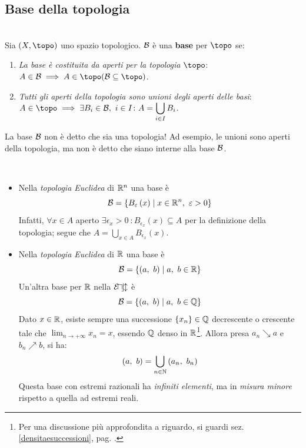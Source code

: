 \subsection{Base della topologia}
\begin{define}[Base.]~{}\\
Sia $\left(X, \topo\right)$ uno spazio topologico. $\mathcal{B}$ è una \textbf{base} per $\topo$ se:
\begin{enumerate}
\item \textit{La base è costituita da aperti per la topologia $\topo$}: $A\in\basis\implies A\in\topo (\basis\subseteq\topo)$.
\item \textit{Tutti gli aperti della topologia sono unioni degli aperti delle basi}:
$\displaystyle A\in\topo\implies\exists B_i\in\basis,\ i\in I\colon A=\bigcup_{i\in I}B_i$.
\end{enumerate}
\end{define}
\begin{attention}
La base $\mathcal{B}$ non è detto che sia una topologia! Ad esempio, le unioni sono aperti della topologia, ma non è detto che siano interne alla base $\mathcal{B}$.
\end{attention}
\begin{examples}~{}
\begin{itemize}
\item Nella \textit{topologia Euclidea} di $\mathbb{R}^n$ una base è
\begin{equation}
\mathcal{B}=\left\{B_{\varepsilon}\left(x\right)\mid x\in\mathbb{R}^n,\ \varepsilon>0\right\}
\end{equation}
Infatti, $\forall x\in A$ aperto $\exists\epsilon_x>0\ \colon B_{\epsilon_x}\left(x\right)\subseteq A$ per la definizione della topologia; segue che $\displaystyle A=\bigcup_{x\in A}B_{\epsilon_x}\left(x\right)$.
\item Nella \textit{topologia Euclidea} di $\mathbb{R}$ una base è
\begin{equation}
	\mathcal{B}=\left\{\left(a,\ b\right)\mid a,\ b\in \mathbb{R}\right\}
\end{equation}
Un'altra base per $\mathbb{R}$ nella $\mathcal{E\! u\! c\! l}$ è 
\begin{equation*}
	\mathcal{B}=\left\{\left(a,\ b\right)\mid a,\ b\in \mathbb{Q}\right\}
\end{equation*}
Dato $x\in\mathbb{R}$, esiste sempre una successione $\left\{x_n\right\}\in\mathbb{Q}$ decrescente o crescente tale che $\displaystyle\lim_{n \to +\infty}x_n=x$, essendo $\mathbb{Q}$ denso in $\mathbb{R}$\footnote{Per una discussione più approfondita a riguardo, si guardi sez. \ref{densitaesuccessioni}, pag. \pageref{densitaesuccessioni}.}. Allora presa $a_n\searrow a$ e $b_n\nearrow b$, si ha:
\begin{equation*}
\left(a,\ b\right)=\bigcup_{n\in \mathbb{N}}\left(a_n,\ b_n\right)
\end{equation*}
Questa base con estremi razionali ha \textit{infiniti elementi}, ma in \textit{misura minore} rispetto a quella ad estremi reali.
\end{itemize}
\vspace{-3mm}
\end{examples}
